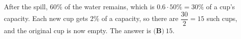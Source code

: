 After the spill, $60\%$ of the water remains, which is $0.6\cdot50\%=30\%$ of a cup's capacity. Each new cup gets $2\%$ of a capacity, so there are $\dfrac{30}{2}=15$ such cups, and the original cup is now empty. The answer is $\boxed{\textbf{(B)}\ 15}$.
